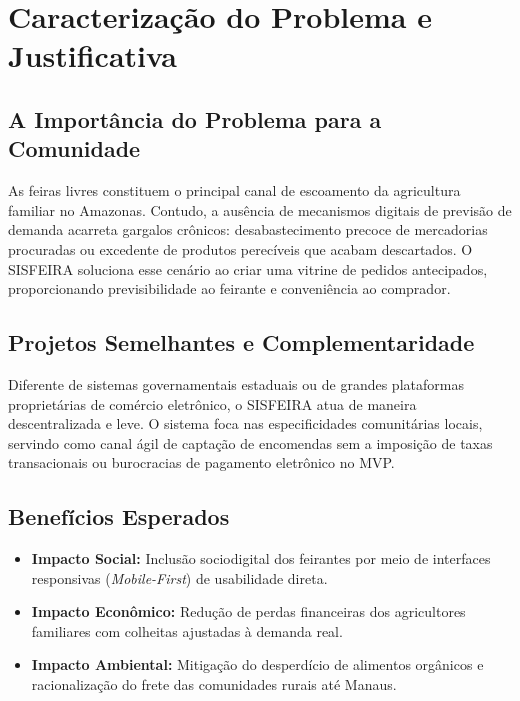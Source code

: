 \documentclass[12pt,a4paper]{article}
\begin{document}

\section{Caracterização do Problema e Justificativa}

\subsection{A Importância do Problema para a Comunidade}

As feiras livres constituem o principal canal de escoamento da agricultura familiar no Amazonas. Contudo, a ausência de mecanismos digitais de previsão de demanda acarreta gargalos crônicos: desabastecimento precoce de mercadorias procuradas ou excedente de produtos perecíveis que acabam descartados. O SISFEIRA soluciona esse cenário ao criar uma vitrine de pedidos antecipados, proporcionando previsibilidade ao feirante e conveniência ao comprador.

\subsection{Projetos Semelhantes e Complementaridade}

Diferente de sistemas governamentais estaduais ou de grandes plataformas proprietárias de comércio eletrônico, o SISFEIRA atua de maneira descentralizada e leve. O sistema foca nas especificidades comunitárias locais, servindo como canal ágil de captação de encomendas sem a imposição de taxas transacionais ou burocracias de pagamento eletrônico no MVP.

\subsection{Benefícios Esperados}

\begin{itemize}[leftmargin=1.5cm]

    \item \textbf{Impacto Social:} Inclusão sociodigital dos feirantes por meio de interfaces responsivas (\textit{Mobile-First}) de usabilidade direta.

    \item \textbf{Impacto Econômico:} Redução de perdas financeiras dos agricultores familiares com colheitas ajustadas à demanda real.

    \item \textbf{Impacto Ambiental:} Mitigação do desperdício de alimentos orgânicos e racionalização do frete das comunidades rurais até Manaus.

\end{itemize}
\end{document}

